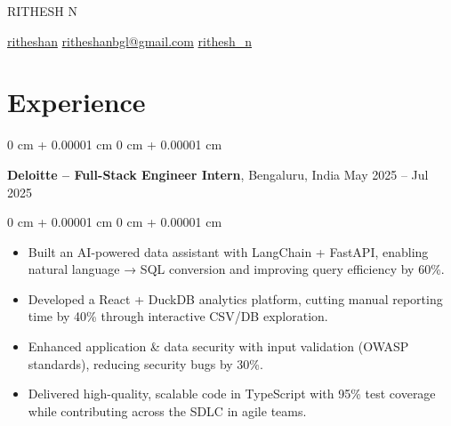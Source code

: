 \documentclass[10pt, letterpaper]{article}
\newenvironment{highlights}{
    \begin{itemize}[
        topsep=0.10 cm,
        parsep=0.10 cm,
        partopsep=0pt,
        itemsep=0pt,
        leftmargin=0 cm + 10pt
    ]
}{
    \end{itemize}
} %
\newenvironment{onecolentry}{
    \begin{adjustwidth}{
        0 cm + 0.00001 cm
    }{
        0 cm + 0.00001 cm
    }
}{
    \end{adjustwidth}
} %
\newenvironment{twocolentry}[2][]{
    \onecolentry
    \def\secondColumn{#2}
    \setcolumnwidth{\fill, 4.5 cm}
    \begin{paracol}{2}
}{
    \switchcolumn \raggedleft \secondColumn
    \end{paracol}
    \endonecolentry
} %
\newenvironment{header}{
    \setlength{\topsep}{0pt}\par\kern\topsep\centering\linespread{1.5}
}{
    \par\kern\topsep
} %
\begin{document}
  \begin{header}
    \fontsize{25 pt}{25 pt}\selectfont RITHESH N

    \vspace{5 pt}

    \normalsize
    \mbox{\raisebox{-0.1\height}\faLinkedin\hspace{2pt}\href{https://www.linkedin.com/in/ritheshan/}{ritheshan}} \hspace{10pt}%
    \mbox{\raisebox{-0.1\height}\faEnvelope\hspace{2pt}\href{mailto:ritheshanbgl@gmail.com}{ritheshanbgl@gmail.com}} \hspace{10pt}%
    \mbox{\hspace{2pt}\href{https://leetcode.com/rithesh_n}{rithesh\_n}}%
\end{header}

    \vspace{5 pt - 0.3 cm}

    \section{Experience}

        \begin{twocolentry}{
            May 2025 – Jul 2025
        }
            \textbf{Deloitte – Full-Stack Engineer Intern}, Bengaluru, India\end{twocolentry}

        \vspace{0.10 cm}
        \begin{onecolentry}
            \begin{highlights}
                \item Built an AI-powered data assistant with LangChain + FastAPI, enabling natural language → SQL conversion and improving query efficiency by 60\%.
                \item Developed a React + DuckDB analytics platform, cutting manual reporting time by 40\% through interactive CSV/DB exploration.
                \item Enhanced application \& data security with input validation (OWASP standards), reducing security bugs by 30\%.
                \item Delivered high-quality, scalable code in TypeScript with 95\% test coverage while contributing across the SDLC in agile teams.
            \end{highlights}
        \end{onecolentry}
\end{document}
